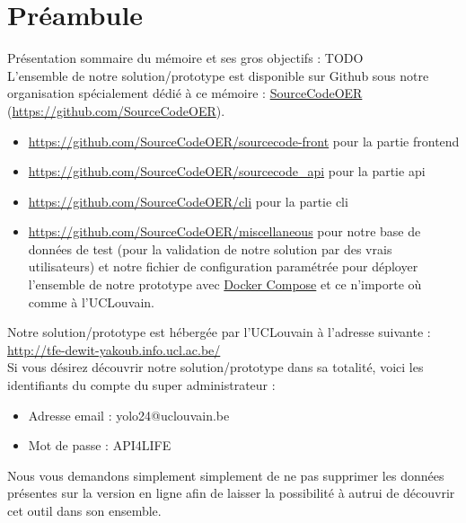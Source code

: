 \chapter*{Préambule}


Présentation sommaire du mémoire et ses gros objectifs : TODO \\

L'ensemble de notre solution/prototype est disponible sur Github sous notre organisation spécialement dédié à ce mémoire : 
\href{https://github.com/SourceCodeOER}{SourceCodeOER} (\href{https://github.com/SourceCodeOER}{https://github.com/SourceCodeOER}).

\begin{itemize}
    \item \href{https://github.com/SourceCodeOER/sourcecode-front}{https://github.com/SourceCodeOER/sourcecode-front} pour la partie \Gls{frontend}
    \item \href{https://github.com/SourceCodeOER/sourcecode\_api}{https://github.com/SourceCodeOER/sourcecode\_api} pour la partie \Gls{api}
    \item \href{https://github.com/SourceCodeOER/cli}{https://github.com/SourceCodeOER/cli} pour la partie \Gls{cli}
    \item \href{https://github.com/SourceCodeOER/miscellaneous}{https://github.com/SourceCodeOER/miscellaneous} pour notre base de données de test (pour la validation de notre solution par des vrais utilisateurs) et notre fichier de configuration paramétrée pour déployer l'ensemble de notre prototype avec \href{https://docs.docker.com/compose/}{Docker Compose} et ce n'importe où comme à l'UCLouvain.
\end{itemize}

Notre solution/prototype est hébergée par l'UCLouvain à l'adresse suivante : \href{http://tfe-dewit-yakoub.info.ucl.ac.be/}{http://tfe-dewit-yakoub.info.ucl.ac.be/} \\

Si vous désirez découvrir notre solution/prototype dans sa totalité, voici les identifiants du compte du super administrateur : 
\begin{itemize}
    \item Adresse email : yolo24@uclouvain.be
    \item Mot de passe : API4LIFE
\end{itemize}
Nous vous demandons simplement simplement de ne pas supprimer les données présentes sur la version en ligne afin de laisser la possibilité à autrui de découvrir cet outil dans son ensemble.

